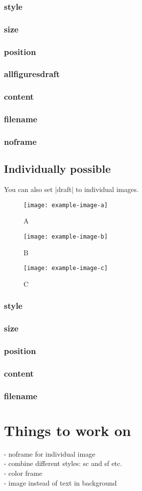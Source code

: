\documentclass[a4paper,
12pt,
english
]{ltxdoc}
\begin{document}
\subsubsection{style}
\subsubsection{size}
\subsubsection{position}
\subsubsection{allfiguresdraft}
\subsubsection{content}
\subsubsection{filename}
\subsubsection{noframe}

\subsection{Individually possible}

You can also set |draft| to individual images.
\begin{codeexample}
\begin{figure}[H]
  \centering
  \texttt{[image: example-image-a]}
  \caption{A}
  \texttt{[image: example-image-b]}
  \caption{B}
  \texttt{[image: example-image-c]}
  \caption{C}
\end{figure}
\end{codeexample}

\subsubsection{style}
\subsubsection{size}
\subsubsection{position}
\subsubsection{content}
\subsubsection{filename}
\clearpage

\section{Things to work on}

- noframe for individual image\\
- combine different styles: sc and sf etc.\\
- color frame\\
- image instead of text in background\\
\end{document}
